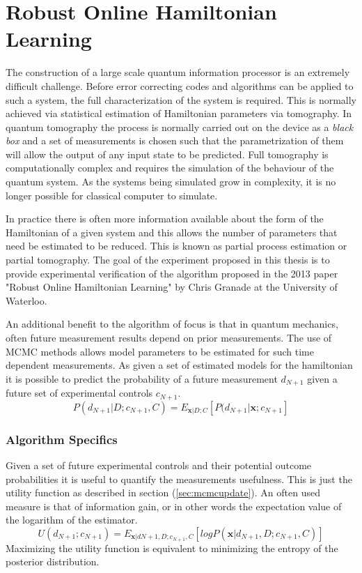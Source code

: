 \section{Robust Online Hamiltonian Learning}
The construction of a large scale quantum information processor is an extremely difficult challenge. Before error correcting codes and algorithms can be applied to such a system, the full characterization of the system is required. This is normally achieved via statistical estimation of Hamiltonian parameters via tomography. In quantum tomography the process is normally carried out on the device as a \textit{black box} and a set of measurements is chosen such that the parametrization of them will allow the output of any input state to be predicted.\cite{tomography} Full tomography is computationally complex and requires the simulation of the behaviour of the quantum system. As the systems being simulated grow in complexity, it is no longer possible for classical computer to simulate.\cite{simulate}

In practice there is often more information available about the form of the Hamiltonian of a given system and this allows the number of parameters that need be estimated to be reduced. This is known as partial process estimation or partial tomography. The goal of the experiment proposed in this thesis is to provide experimental verification of the algorithm proposed in the 2013 paper "Robust Online Hamiltonian Learning" by Chris Granade at the University of Waterloo.\cite{hamiltonian_learning} 

An additional benefit to the algorithm of focus is that in quantum mechanics, often future measurement results depend on prior measurements. The use of MCMC methods allows model parameters to be estimated for such time dependent measurements. As given a set of estimated models for the hamiltonian it is possible to predict the probability of a future measurement $d_{N+1}$ given a future set of experimental controls $c_{N+1}$. 
\begin{equation}
P(d_{N+1}\big|D;c_{N+1},C) = E_{\mathbf{x}|D;C}[P(d_{N+1}\big|\mathbf{x};c_{N+1}]
\label{eq:batch}
\end{equation}

\subsubsection{Algorithm Specifics}
Given a set of future experimental controls and their potential outcome probabilities it is useful to quantify the measurements usefulness. This is just the utility function as described in section (\ref{sec:mcmcupdate}). An often used measure is that of information gain, or in other words the expectation value of the logarithm of the estimator. 
\begin{equation}
U(d_{N+1};c_{N+1}) = E_{\mathbf{x}|d{N+1},D;c_{N+1},C}[log P(\mathbf{x}|d_{N+1},D;c_{N+1},C)]
\label{eq:utilityfunction}
\end{equation}
Maximizing the utility function is equivalent to minimizing the entropy of the posterior distribution.

